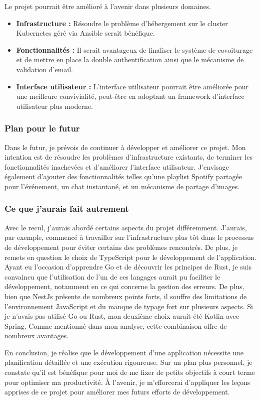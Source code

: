 Le projet pourrait être amélioré à l'avenir dans plusieurs domaines.

\begin{itemize}
    \item \textbf{Infrastructure :} Résoudre le problème d'hébergement sur le cluster Kubernetes géré via Ansible serait bénéfique.
    \item \textbf{Fonctionnalités :} Il serait avantageux de finaliser le système de covoiturage et de mettre en place la double authentification ainsi que le mécanisme de validation d'email.
    \item \textbf{Interface utilisateur :} L'interface utilisateur pourrait être améliorée pour une meilleure convivialité, peut-être en adoptant un framework d'interface utilisateur plus moderne.
\end{itemize}

\subsubsection{Plan pour le futur}\label{subsubsec:plan-futur}

Dans le futur, je prévois de continuer à développer et améliorer ce projet.
Mon intention est de résoudre les problèmes d'infrastructure existants, de terminer les fonctionnalités inachevées et d'améliorer l'interface utilisateur.
J'envisage également d'ajouter des fonctionnalités telles qu'une playlist Spotify partagée pour l'événement, un chat instantané, et un mécanisme de partage d'images.

\subsubsection{Ce que j'aurais fait autrement}\label{subsubsec:ce-que-j-aurais-fait-autrement}

Avec le recul, j'aurais abordé certains aspects du projet différemment.
J'aurais, par exemple, commencé à travailler sur l'infrastructure plus tôt dans le processus de développement pour éviter certains des problèmes rencontrés.
De plus, je remets en question le choix de TypeScript pour le développement de l'application.
Ayant eu l'occasion d'apprendre Go et de découvrir les principes de Rust, je suis convaincu que l'utilisation de l'un de ces langages aurait pu faciliter le développement, notamment en ce qui concerne la gestion des erreurs.
De plus, bien que NestJs présente de nombreux points forts, il souffre des limitations de l'environnement JavaScript et du manque de typage fort sur plusieurs aspects.
Si je n'avais pas utilisé Go ou Rust, mon deuxième choix aurait été Kotlin avec Spring.
Comme mentionné dans mon analyse, cette combinaison offre de nombreux avantages.


En conclusion, je réalise que le développement d'une application nécessite une planification détaillée et une exécution rigoureuse.
Sur un plan plus personnel, je constate qu'il est bénéfique pour moi de me fixer de petits objectifs à court terme pour optimiser ma productivité.
À l'avenir, je m'efforcerai d'appliquer les leçons apprises de ce projet pour améliorer mes futurs efforts de développement.